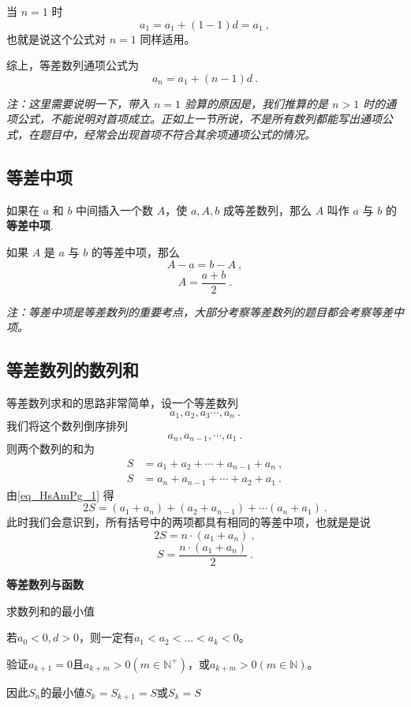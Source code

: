 当 $n = 1$ 时
\begin{equation}
a_1 = a_1 + (1 - 1)d = a_1~,
\end{equation}
也就是说这个公式对 $n = 1$ 同样适用。

综上，等差数列通项公式为
\begin{equation}
a_n = a_1 + (n - 1)d~.
\end{equation}

\textsl{注：这里需要说明一下，带入 $n = 1$ 验算的原因是，我们推算的是 $n > 1$ 时的通项公式，不能说明对首项成立。正如上一节所说，不是所有数列都能写出通项公式，在题目中，经常会出现首项不符合其余项通项公式的情况。}

\subsection{等差中项}
如果在 $a$ 和 $b$ 中间插入一个数 $A$，使 $a,A,b$ 成等差数列，那么 $A$ 叫作 $a$ 与 $b$ 的\textbf{等差中项}.

如果 $A$ 是 $a$ 与 $b$ 的等差中项，那么
\begin{equation}
A - a = b - A~,
\end{equation}
\begin{equation}
A = \frac{a+b}{2}~.
\end{equation}

\textsl{注：等差中项是等差数列的重要考点，大部分考察等差数列的题目都会考察等差中项。}

\subsection{等差数列的数列和}

等差数列求和的思路非常简单，设一个等差数列
\begin{equation}
a_1,a_2,a_3\cdots,a_n~.
\end{equation}
我们将这个数列倒序排列
\begin{equation}
a_n,a_{n-1},\cdots,a_1~.
\end{equation}
则两个数列的和为
\begin{equation}\label{eq_HsAmPg_1}
\begin{aligned}
S &= a_1 + a_2 + \cdots + a_{n-1} + a_n ~,\\
S &= a_n + a_{n - 1} + \cdots + a_2 + a_1~.
\end{aligned}
\end{equation}
由\autoref{eq_HsAmPg_1} 得
\begin{equation}
2S = (a_1+a_n) + (a_2+a_{n-1}) +\cdots (a_n + a_1)~.
\end{equation}
此时我们会意识到，所有括号中的两项都具有相同的等差中项，也就是是说
\begin{equation}
2S = n \cdot (a_1+a_n)~,
\end{equation}
\begin{equation}
S = \frac{n\cdot(a_1+a_n)}{2}~.
\end{equation}

\textbf{等差数列与函数}

求数列和的最小值

若$a_0<0,d>0$，则一定有$a_1<a_2<\dots<a_{k}<0$。

验证$a_{k+1} =0$且$a_{k+m}>0(m\in\mathbb{N}^+)$，或$a_{k+m}>0(m\in\mathbb{N})$。

因此$S_n$的最小値$S_k=S_{k+1}=S$或$S_k=S$
